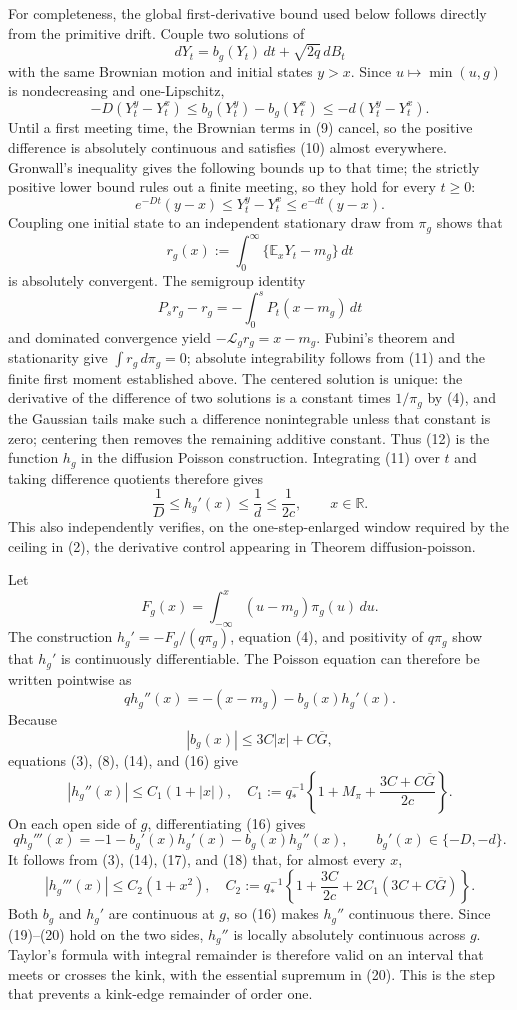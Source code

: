 For completeness, the global first-derivative bound used below follows directly from the primitive drift.  Couple two solutions of
\[
 dY_t=b_g(Y_t)\,dt+\sqrt{2q}\,dB_t
 \tag{9}
\]
with the same Brownian motion and initial states \(y>x\).  Since \(u\mapsto\min(u,g)\) is nondecreasing and one-Lipschitz,
\[
 -D(Y_t^y-Y_t^x)
 \leq b_g(Y_t^y)-b_g(Y_t^x)
 \leq-d(Y_t^y-Y_t^x).
 \tag{10}
\]
Until a first meeting time, the Brownian terms in (9) cancel, so the positive difference is absolutely continuous and satisfies (10) almost everywhere.  Gronwall's inequality gives the following bounds up to that time; the strictly positive lower bound rules out a finite meeting, so they hold for every \(t\geq0\):
\[
 e^{-Dt}(y-x)\leq Y_t^y-Y_t^x\leq e^{-dt}(y-x).
 \tag{11}
\]
Coupling one initial state to an independent stationary draw from \(\pi_g\) shows that
\[
 r_g(x):=\int_0^\infty\{\mathbb E_xY_t-m_g\}\,dt
 \tag{12}
\]
is absolutely convergent.  The semigroup identity
\[
 P_s r_g-r_g=-\int_0^sP_t(x-m_g)\,dt
 \tag{13}
\]
and dominated convergence yield \(-\mathcal L_g r_g=x-m_g\).  Fubini's theorem and stationarity give \(\int r_g\,d\pi_g=0\); absolute integrability follows from (11) and the finite first moment established above.  The centered solution is unique: the derivative of the difference of two solutions is a constant times \(1/\pi_g\) by (4), and the Gaussian tails make such a difference nonintegrable unless that constant is zero; centering then removes the remaining additive constant.  Thus (12) is the function \(h_g\) in the diffusion Poisson construction.  Integrating (11) over \(t\) and taking difference quotients therefore gives
\[
 \frac1D\leq h_g'(x)\leq\frac1d\leq\frac1{2c},
 \qquad x\in\mathbb R.
 \tag{14}
\]
This also independently verifies, on the one-step-enlarged window required by the ceiling in (2), the derivative control appearing in Theorem \(\mathrm{diffusion\mbox{-}poisson}\).

Let
\[
 F_g(x)=\int_{-\infty}^x(u-m_g)\pi_g(u)\,du.
 \tag{15}
\]
The construction \(h_g'=-F_g/(q\pi_g)\), equation (4), and positivity of \(q\pi_g\) show that \(h_g'\) is continuously differentiable.  The Poisson equation can therefore be written pointwise as
\[
 qh_g''(x)=-(x-m_g)-b_g(x)h_g'(x).
 \tag{16}
\]
Because
\[
 |b_g(x)|\leq3C|x|+C\overline G,
 \tag{17}
\]
equations (3), (8), (14), and (16) give
\[
 |h_g''(x)|\leq C_1(1+|x|),
 \quad
 C_1:=q_*^{-1}\left\{1+M_\pi+\frac{3C+C\overline G}{2c}\right\}.
 \tag{18}
\]
On each open side of \(g\), differentiating (16) gives
\[
 qh_g'''(x)=-1-b_g'(x)h_g'(x)-b_g(x)h_g''(x),
 \qquad b_g'(x)\in\{-D,-d\}.
 \tag{19}
\]
It follows from (3), (14), (17), and (18) that, for almost every \(x\),
\[
 |h_g'''(x)|\leq C_2(1+x^2),
 \quad
 C_2:=q_*^{-1}\left\{1+\frac{3C}{2c}
       +2C_1(3C+C\overline G)\right\}.
 \tag{20}
\]
Both \(b_g\) and \(h_g'\) are continuous at \(g\), so (16) makes \(h_g''\) continuous there.  Since (19)--(20) hold on the two sides, \(h_g''\) is locally absolutely continuous across \(g\).  Taylor's formula with integral remainder is therefore valid on an interval that meets or crosses the kink, with the essential supremum in (20).  This is the step that prevents a kink-edge remainder of order one.

